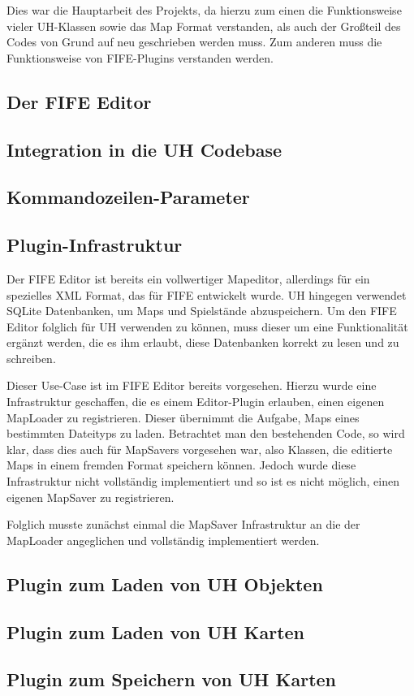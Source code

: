 Dies war die Hauptarbeit des Projekts, da hierzu zum einen die Funktionsweise vieler
UH-Klassen sowie das Map Format verstanden, als auch der Großteil des Codes von Grund
auf neu geschrieben werden muss. Zum anderen muss die Funktionsweise von FIFE-Plugins
verstanden werden.

\subsection{Der FIFE Editor}

\subsection{Integration in die UH Codebase}

\subsection{Kommandozeilen-Parameter}

\subsection{Plugin-Infrastruktur}
Der FIFE Editor ist bereits ein vollwertiger Mapeditor, allerdings für ein spezielles XML Format,
das für FIFE entwickelt wurde. UH hingegen verwendet SQLite Datenbanken, um Maps und Spielstände
abzuspeichern. Um den FIFE Editor folglich für UH verwenden zu können, muss dieser um eine
Funktionalität ergänzt werden, die es ihm erlaubt, diese Datenbanken korrekt zu lesen und zu schreiben.

Dieser Use-Case ist im FIFE Editor bereits vorgesehen. Hierzu wurde eine Infrastruktur geschaffen, die
es einem Editor-Plugin erlauben, einen eigenen MapLoader zu registrieren. Dieser übernimmt die
Aufgabe, Maps eines bestimmten Dateityps zu laden. Betrachtet man den bestehenden Code, so wird klar,
dass dies auch für MapSavers vorgesehen war, also Klassen, die editierte Maps in einem fremden Format
speichern können. Jedoch wurde diese Infrastruktur nicht vollständig implementiert und so ist es
nicht möglich, einen eigenen MapSaver zu registrieren.

Folglich musste zunächst einmal die MapSaver Infrastruktur an die der MapLoader angeglichen und vollständig
implementiert werden.

\subsection{Plugin zum Laden von UH Objekten}
\subsection{Plugin zum Laden von UH Karten}
\subsection{Plugin zum Speichern von UH Karten}



